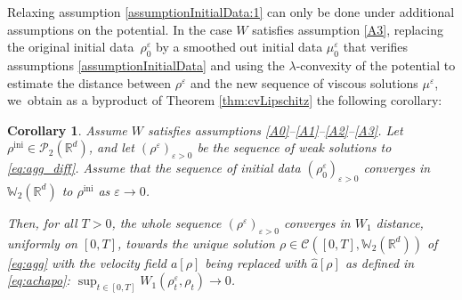 \documentclass[11pt]{article}
\numberwithin{equation}{section}
\newcommand{\ini}{\mathrm{ini}}
\def\RR{\mathbb{R}}
\def\WW{\mathbb{W}}
\def\eps{\varepsilon}
\def\calC{{\mathcal C}}
\def\calP{{\mathcal P}}
\def\achapo{\widehat{a}}
\theoremstyle{plain}
\newtheorem{corollary}[theorem]{Corollary}
\theoremstyle{definition}
\begin{document}
Relaxing assumption \eqref{assumptionInitialData:1} can only be done under additional assumptions on the potential. In the case $W$ satisfies assumption \eqref{A3}, replacing the original initial data~$\rho^\eps_0$ by a smoothed out initial data $\mu_0^\eps$ that verifies assumptions \eqref{assumptionInitialData} and using the $\lambda$\nobreakdash-convexity of the potential to estimate the distance between $\rho^\eps$ and the new sequence of viscous solutions $\mu^\eps$, we~obtain as a byproduct of Theorem \ref{thm:cvLipschitz} the following corollary:
\begin{corollary}\label{coroll:cvLambdaCvx}
Assume $W$ satisfies assumptions \eqref{A0}--\eqref{A1}--\eqref{A2}--\eqref{A3}. Let $\rho^{\ini} \in \calP_2(\RR^d)$, and let $(\rho^\eps)_{\eps > 0}$ be the sequence of weak solutions to \eqref{eq:agg_diff}. Assume that the sequence of initial data $(\rho_0^\eps)_{\eps>0}$ converges in $\WW_2(\RR^d)$ to $\rho^{\ini}$ as $\eps \to 0$.

Then, for all $T>0$, the whole sequence $(\rho^\eps)_{\eps > 0}$ converges in $W_1$ distance, uniformly on $[0,T]$, towards the unique solution $\rho \in \calC([0,T], \WW _2(\RR^d))$ of \eqref{eq:agg} with the velocity field $a[\rho]$ being replaced with $\achapo[\rho]$ as defined in \eqref{eq:achapo}: $\sup_{t\in[0, T]} W_1(\rho_t^\eps,\rho_t) \to 0$.
\end{corollary}
\end{document}
